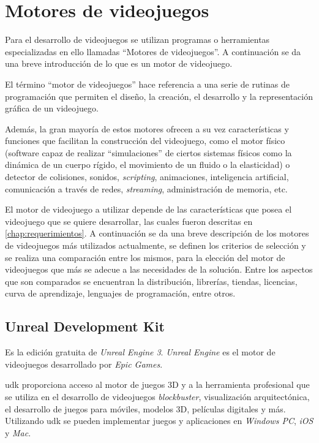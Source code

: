 \section{Motores de videojuegos}

Para el desarrollo de videojuegos se utilizan programas o herramientas
especializadas en ello llamadas \enquote{Motores de videojuegos}. A continuación
se da una breve introducción de lo que es un motor de videojuego.

El término \enquote{motor de videojuegos} hace referencia a una serie de rutinas
de programación que permiten el diseño, la creación, el desarrollo y la
representación gráfica de un videojuego\cite{videojuego:telechea}.

Además, la gran mayoría de estos motores ofrecen a su vez características y
funciones que facilitan la construcción del videojuego, como el motor físico
(software capaz de realizar \enquote{simulaciones} de ciertos sistemas físicos
como la dinámica de un cuerpo rígido, el movimiento de un fluido o la
elasticidad) o detector de colisiones, sonidos, \textit{scripting}, animaciones,
inteligencia artificial, comunicación a través de redes, \textit{streaming},
administración de memoria, etc\cite{videojuego:telechea}.

El motor de videojuego a utilizar depende de las características que posea el
videojuego que se quiere desarrollar, las cuales fueron descritas en
\ref{chap:requerimientos}. A continuación se da una breve descripción
de los motores de videojuegos más utilizados actualmente, se definen los
criterios de selección y se realiza una comparación entre los mismos, para la
elección del motor de videojuegos que más se adecue a las necesidades de la
solución. Entre los aspectos que son comparados se encuentran la distribución,
librerías, tiendas, licencias, curva de aprendizaje, lenguajes de programación,
entre otros.

\subsection{Unreal Development Kit}

Es la edición gratuita de \textit{Unreal Engine 3}. \textit{Unreal Engine} es el
motor de videojuegos desarrollado por \textit{Epic Games}\cite{unrealengine}.

\Gls{udk} proporciona acceso al motor de juegos 3D y a la herramienta profesional 
que se utiliza en el desarrollo de videojuegos \textit{blockbuster}, visualización 
arquitectónica, el desarrollo de juegos para móviles, modelos 3D, películas digitales 
y más. Utilizando \Gls{udk} se pueden implementar juegos y aplicaciones en
\textit{Windows PC}, \textit{iOS} y \textit{Mac}\cite{unrealengine}.

